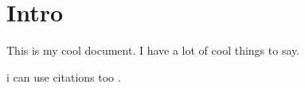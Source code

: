 \section{Intro}

This is my cool document. I have a lot of cool things to say. 

i can use citations too \cite{normal_distribution_wiki_page}.